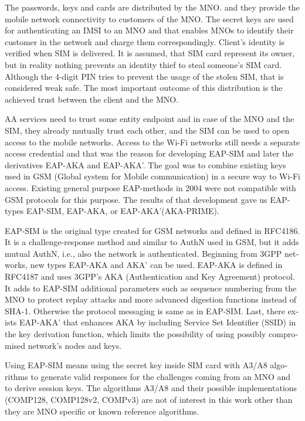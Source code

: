 \documentclass[12pt,a4paper,english]{tutthesis}
\begin{document}
\begin{otherlanguage}{english}
The passwords, keys and cards are distributed by the MNO.
 and they 
provide the mobile network connectivity to customers of the MNO.  The
secret keys are used for authenticating an IMSI to an MNO and that
enables MNOs to identify their customer in the network and charge them
correspondingly.  Client's identity is verified when SIM is delivered.
It is assumed, that SIM card represent its owner, but in reality
nothing prevents an identity thief to steal someone's SIM
card. Although the 4-digit PIN tries to prevent the usage of the
stolen SIM, that is considered weak safe\cite[p.31]{aaa-nakhjiri2005}.
The most important outcome of this distribution is the achieved trust
between the client and the MNO.


AA services need to trust some entity endpoint and in case of the MNO
and the
SIM, they already mutually trust each other, and the SIM can be used 
to open access to the mobile networks.
Access to the Wi-Fi networks still needs a separate access credential
and that was the reason for developing EAP-SIM and later the
derivatives EAP-AKA and EAP-AKA'.  The goal was to combine 
existing keys used in  GSM (Global system for Mobile communication)
in a secure way to Wi-Fi access. Existing general purpose EAP-methods in 2004 were not
compatible with GSM protocols for this purpose.\cite[p.93]{hav-doc}
The results of that development gave us EAP-types EAP-SIM, EAP-AKA, or
EAP-AKA'(AKA-PRIME).

EAP-SIM is the original type created for GSM networks and defined 
in RFC4186\cite{rfc4186}.
It is a challenge-response method and similar to AuthN used in GSM, 
but it adds mutual AuthN, i.e., also the network is authenticated.
Beginning from 3GPP networks, new types EAP-AKA and AKA' can be used.
EAP-AKA is defined in RFC4187\cite{rfc4187} and 
uses 3GPP's AKA (Authentication and Key Agreement) protocol.
It adds to EAP-SIM additional parameters\cite{rfc5448} such as
sequence numbering from the MNO to protect replay attacks and more
advanced digestion functions instead of SHA-1.
Otherwise the protocol messaging is same as in  EAP-SIM.
Last, there exists EAP-AKA' that enhances AKA by including Service Set
Identifier (SSID) 
in the key derivation function, which limits the possibility of using possibly
compromised network's nodes and keys. 


  Using EAP-SIM means using the secret key inside SIM card with A3/A8
algorithms to generate valid responses for the challenges coming from 
an MNO and to derive session keys.  The algorithms A3/A8 and their
possible implementations (COMP128, COMP128v2, COMPv3) are not of
interest in this work other than they are MNO specific or known reference algorithms.



\end{otherlanguage}
\end{document}
